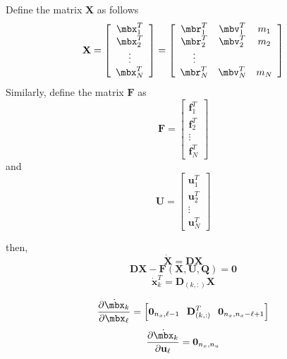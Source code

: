 Define the matrix $\mathbf{X}$ as follows
%
\begin{equation}
     \mathbf{X} = \left[
     \begin{array}{ccc}
         \mbx_1^T \\
         \mbx_2^T \\
         \vdots \\
         \mbx_N^T
     \end{array}
     \right]
     =
     \left[
     \begin{array}{ccc}
         \mbr_1^T & \mbv_1^T & m_1 \\
         \mbr_2^T & \mbv_2^T & m_2\\
         \vdots \\
         \mbr_N^T & \mbv_N^T & m_N
     \end{array}
     \right]
\end{equation}
%
Similarly, define the matrix $\mathbf{F}$ as 
%
\begin{equation}
   \mathbf{F} = \left[
     \begin{array}{ccc}
         \mathbf{f}_1^T \\
         \mathbf{f}_2^T \\
         \vdots \\
         \mathbf{f}_N^T
     \end{array}
     \right]
\end{equation}
%
and
%
\begin{equation}
   \mathbf{U} = \left[
     \begin{array}{ccc}
         \mathbf{u}_1^T \\
         \mathbf{u}_2^T \\
         \vdots \\
         \mathbf{u}_N^T
     \end{array}
     \right]
\end{equation}

then,
%
\begin{equation}
    \dot{\mathbf{X}} = \mathbf{D}\mathbf{X}
\end{equation}
%
\begin{equation}
 \mathbf{D}\mathbf{X} - \mathbf{F}(\mathbf{X},\mathbf{U},\mathbf{Q}) = \mathbf{0}
\end{equation}
%
\begin{equation}
    \dot{\mathbf{x}}_k^T = \mathbf{D}_{(k,:)}\mathbf{X}
\end{equation}
%

\begin{equation}
     \frac{\partial \dot{\mbx}_k}{\partial \mbx_{\ell}} = \left[ \mathbf{0}_{n_x,\ell-1} 
     \hspace{.1 in} \mathbf{D}_{(k,:)}^T \hspace{.1 in}  \mathbf{0}_{n_x,n_x - \ell+1} \right]
\end{equation}
%
\begin{equation}
     \frac{\partial \dot{\mbx}_k}{\partial \mathbf{u}_{\ell}} = \mathbf{0}_{n_x,n_u} 
\end{equation}


